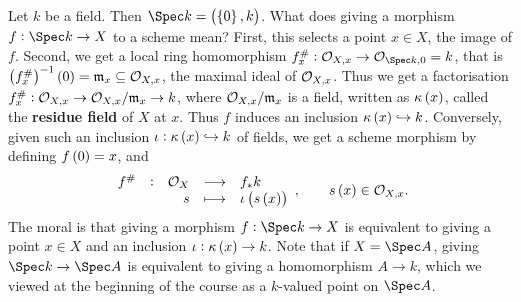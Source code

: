\begin{example*}
Let $ k $ be a field. Then $ \Spec k = \br{\cbr{0}, k} $. What does giving a morphism $ f : \Spec k \to X $ to a scheme mean? First, this selects a point $ x \in X $, the image of $ f $. Second, we get a local ring homomorphism $ f_x^\# : \OOO_{X, x} \to \OOO_{\Spec k, 0} = k $, that is $ \br{f_x^\#}^{-1}\br{0} = \mmm_x \subseteq \OOO_{X, x} $, the maximal ideal of $ \mathcal{O}_{X, x} $. Thus we get a factorisation $ f_x^\# : \mathcal{O}_{X, x} \to \mathcal{O}_{X, x} / \mathfrak{m}_x \to k $, where $ \mathcal{O}_{X, x} / \mathfrak{m}_x $ is a field, written as $ \kappa\br{x} $, called the \textbf{residue field} of $ X $ at $ x $. Thus $ f $ induces an inclusion $ \kappa\br{x} \hookrightarrow k $. Conversely, given such an inclusion $ \iota : \kappa\br{x} \hookrightarrow k $ of fields, we get a scheme morphism by defining $ f\br{0} = x $, and
$$ \function[f^\#]{\OOO_X}{f_*k}{s}{\iota\br{s\br{x}}}, \qquad s\br{x} \in \OOO_{X, x}. $$
The moral is that giving a morphism $ f : \Spec k \to X $ is equivalent to giving a point $ x \in X $ and an inclusion $ \iota : \kappa\br{x} \to k $. Note that if $ X = \Spec A $, giving $ \Spec k \to \Spec A $ is equivalent to giving a homomorphism $ A \to k $, which we viewed at the beginning of the course as a $ k $-valued point on $ \Spec A $.
\end{example*}

